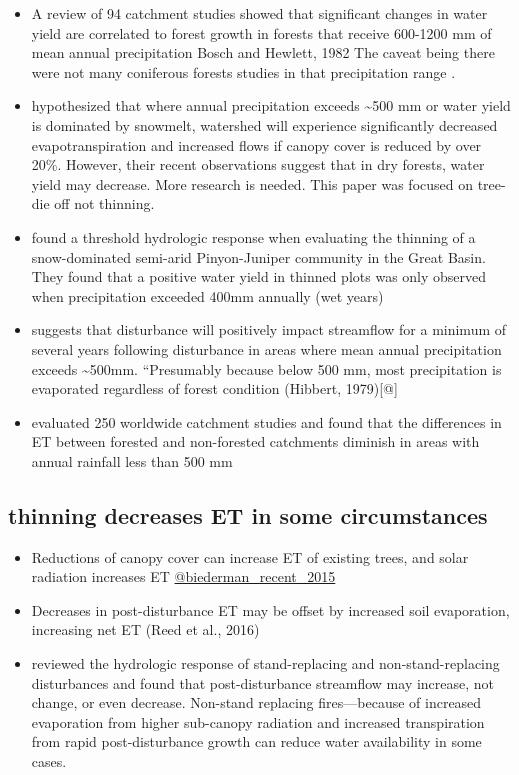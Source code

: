 \documentclass[
  number]{elsarticle}
\begin{document}
\begin{itemize}
\item
  A review of 94 catchment studies showed that significant changes in
  water yield are correlated to forest growth in forests that receive
  600-1200 mm of mean annual precipitation Bosch and Hewlett, 1982 The
  caveat being there were not many coniferous forests studies in that
  precipitation range \citep{bosch_review_1982}.
\item
  \citep{adams_ecohydrological_2012} hypothesized that where annual
  precipitation exceeds \textasciitilde500 mm or water yield is
  dominated by snowmelt, watershed will experience significantly
  decreased evapotranspiration and increased flows if canopy cover is
  reduced by over 20\%. However, their recent observations suggest that
  in dry forests, water yield may decrease. More research is needed.
  This paper was focused on tree-die off not thinning.
\item
  \citep{carroll_evaluating_2016} found a threshold hydrologic response
  when evaluating the thinning of a snow-dominated semi-arid
  Pinyon-Juniper community in the Great Basin. They found that a
  positive water yield in thinned plots was only observed when
  precipitation exceeded 400mm annually (wet years)
\item
  \citep{biederman_streamflow_2022} suggests that disturbance will
  positively impact streamflow for a minimum of several years following
  disturbance in areas where mean annual precipitation exceeds
  \textasciitilde500mm. ``Presumably because below 500 mm, most
  precipitation is evaporated regardless of forest condition (Hibbert,
  1979){[}@{]}
\item
  \citep{zhang_response_2001} evaluated 250 worldwide catchment studies
  and found that the differences in ET between forested and non-forested
  catchments diminish in areas with annual rainfall less than 500 mm
\end{itemize}

\subsection{thinning decreases ET in some
circumstances}\label{thinning-decreases-et-in-some-circumstances}

\begin{itemize}
\item
  Reductions of canopy cover can increase ET of existing trees, and
  solar radiation increases ET
  \href{Chen\%20et\%20al.,\%202005;\%20Bennett\%20et\%20al.,\%202018}{@biederman\_recent\_2015}
\item
  Decreases in post-disturbance ET may be offset by increased soil
  evaporation, increasing net ET (Reed et al., 2016)
\item
  \citep{goeking_forests_2020} reviewed the hydrologic response of
  stand-replacing and non-stand-replacing disturbances and found that
  post-disturbance streamflow may increase, not change, or even
  decrease. Non-stand replacing fires---because of increased evaporation
  from higher sub-canopy radiation and increased transpiration from
  rapid post-disturbance growth can reduce water availability in some
  cases.
\end{itemize}
\end{document}
